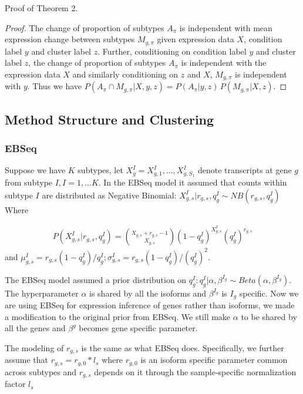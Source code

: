\documentclass[aoas,preprint]{imsart}
\begin{document}
Proof of Theorem 2.

\begin{proof}
The change of proportion of subtypes $A_\pi$ is independent with mean expression change between subtypes $M_{g,\pi}$ given expression data $X$, condition label $y$ and cluster label $z$.
Further, conditioning on condition label $y$ and cluster label $z$, the change of proportion of subtypes $A_\pi$ is independent with the expression data $X$ and similarly conditioning on $z$ and $X$, $M_{g,\pi}$ is independent with $y$. 
Thus we have $  P\left(A_\pi \cap M_{g,\pi} |X,y,z \right) 
  =  P\left(A_\pi |y,z \right) \, 
                      P\left(M_{g,\pi}| X,z \right).  $
\end{proof}


\subsection{Method Structure and Clustering}

\subsubsection{EBSeq}


Suppose we have $K$ subtypes, let $X_g^I = X_{g, 1}^I, ... , X_{g, S_1}^I$ denote transcripts at gene $g$ from subtype $I, I = 1, ... K$.  In the EBSeq model it assumed that counts within subtype $I$ are distributed as Negative Binomial:
$X_{g, s}^I | r_{g,s}, q_g^I \sim NB(r_{g,s}, q_g^I)$ Where

\begin{eqnarray*}
P(X_{g,s}^I | r_{g,s}, q_g^I ) = {X_{g,s} + r_{g,s} - 1 \choose X_{g,s} }(1 - q_g^I)^{X_{g,s}^I} (q_g^I)^{r_{g,s}}
\end{eqnarray*}
and $\mu_{g,s}^I = r_{g,s}(1 - q_g^I) / q_g^I; \sigma_{g,s}^I = r_{g,s}(1 - q_g^I)/ (q_g^I)^2.$

The EBSeq model assumed a prior distribution on $q_g^I : q_g^I | \alpha, \beta^{I_g} \sim Beta(\alpha, \beta^{I_g}).$ The hyperparameter $\alpha$ is shared by all the isoforms and $\beta^{I_g}$ is $I_g$ specific.
Now we are using EBSeq for expression inference of genes rather than isoforms, we made a modification to the original prior from EBSeq. 
We still make $\alpha$ to be shared by all the genes and $\beta^g$ becomes gene specific parameter. 

The modeling of $r_{g,s}$ is the same as what EBSeq does. Specifically, we further assume that $r_{g,s} = r_{g,0}*l_s$ where $r_{g,0}$ is an isoform specific parameter common across subtypes and $r_{g,s}$ depends on it through the sample-specific normalization factor $l_s$
\end{document}
